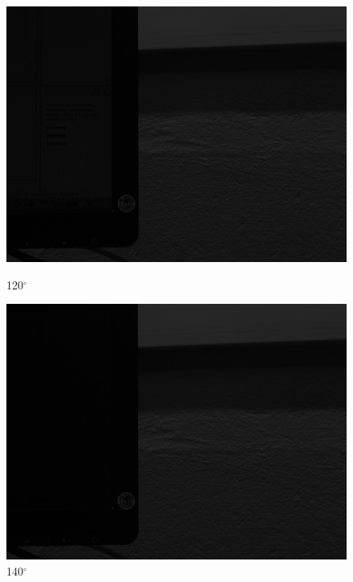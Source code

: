 \documentclass{article}
\begin{document}
\begin{figure}[H]
\begin{minipage}[b]{0.16\linewidth}
\includegraphics[width=1.0\textwidth,natwidth=100,natheight=100]{../LMS/im120.png}
  \caption{120$^\circ$}
  \label{fig:lms11-7}
\end{minipage}
\quad
\begin{minipage}[b]{0.16\linewidth}
\includegraphics[width=1.0\textwidth,natwidth=100,natheight=100]{../LMS/im140.png}
  \caption{140$^\circ$}
  \label{fig:lms11-8}
\end{minipage}
\quad
\begin{minipage}[b]{0.16\linewidth}

\end{minipage}
\end{figure}
\end{document}
